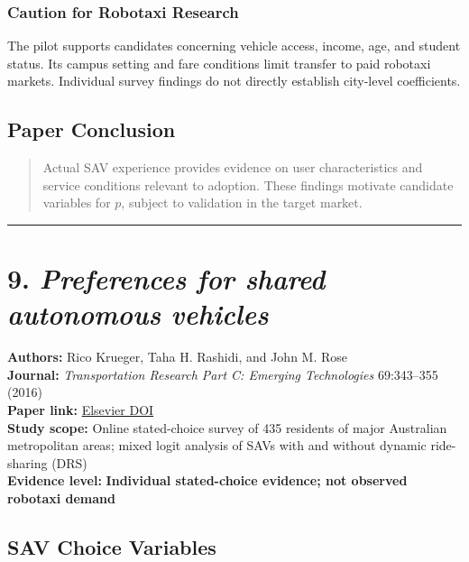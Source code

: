 \documentclass[10pt,a4paper]{article}
\begin{document}
\begin{mdframed}[linecolor=red!60,linewidth=2pt]
\subsubsection{Caution for Robotaxi Research}

The pilot supports candidates concerning vehicle access, income,
age, and student status.
Its campus setting and fare conditions limit transfer to paid robotaxi markets.
Individual survey findings do not directly establish city-level coefficients.

\subsection{Paper Conclusion}

\begin{quote}
Actual SAV experience provides evidence on user characteristics
and service conditions relevant to adoption.
These findings motivate candidate variables for $p$,
subject to validation in the target market.
\end{quote}


\begin{center}\rule{0.5\linewidth}{0.5pt}\end{center}

\hypertarget{preferences-for-shared-autonomous-vehicles}{%
\section{\texorpdfstring{9. \emph{Preferences for shared autonomous vehicles}}{9. Preferences for shared autonomous vehicles}}\label{preferences-for-shared-autonomous-vehicles}}

\textbf{Authors:} Rico Krueger, Taha H. Rashidi, and John M. Rose\\
\textbf{Journal:} \emph{Transportation Research Part C:
Emerging Technologies} 69:343--355 (2016)\\
\textbf{Paper link:}
\href{https://doi.org/10.1016/j.trc.2016.06.015}{Elsevier DOI}\\
\textbf{Study scope:} Online stated-choice survey of 435 residents
of major Australian metropolitan areas; mixed logit analysis
of SAVs with and without dynamic ride-sharing (DRS)\\
\textbf{Evidence level:}
\textbf{Individual stated-choice evidence;
not observed robotaxi demand}

\subsection{SAV Choice Variables}


\end{mdframed}
\end{document}
